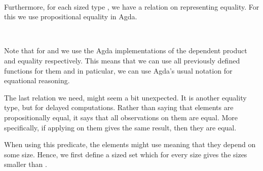 \begin{code}%
\>[0]\AgdaSpace{}%
\AgdaSymbol{:}\AgdaSpace{}%
\AgdaSymbol{(}\AgdaSpace{}%
\AgdaSymbol{:}\AgdaSpace{}%
\AgdaSymbol{)}\AgdaSpace{}%
\AgdaSpace{}%
\AgdaSpace{}%
\AgdaSpace{}%
\AgdaSpace{}%
\<%
\\
\>[0]\AgdaSpace{}%
\AgdaSpace{}%
\AgdaSpace{}%
\AgdaSpace{}%
\AgdaSymbol{=}\AgdaSpace{}%
\AgdaSymbol{(}\AgdaSpace{}%
\AgdaSymbol{:}\AgdaSpace{}%
\AgdaSpace{}%
\AgdaSymbol{)}\AgdaSpace{}%
\AgdaSpace{}%
\AgdaSpace{}%
\<%
\end{code}

Furthermore, for each sized type , we have a relation on  representing equality.
For this we use propositional equality in Agda.

\begin{code}%
\>[0]\AgdaSpace{}%
\AgdaSymbol{:}\AgdaSpace{}%
\AgdaSymbol{(}\AgdaSpace{}%
\AgdaSymbol{:}\AgdaSpace{}%
\AgdaSymbol{)}\AgdaSpace{}%
\AgdaSpace{}%
\AgdaSpace{}%
\AgdaSpace{}%
\<%
\\
\>[0]\AgdaSpace{}%
\AgdaSpace{}%
\AgdaSpace{}%
\AgdaSpace{}%
\AgdaSymbol{=}\AgdaSpace{}%
\AgdaSpace{}%
\AgdaSpace{}%
\<%
\end{code}

Note that for  and  we use the Agda implementations of the dependent product and equality respectively.
This means that we can use all previously defined functions for them and in paticular, we can use Agda's usual notation for equational reasoning.

The last relation we need, might seem a bit unexpected.
It is another equality type, but for delayed computations.
Rather than saying that elements are propositionally equal, it says that all observations on them are equal.
More specifically, if applying  on them gives the same result, then they are equal.

When using this predicate, the elements might use  meaning that they depend on some size.
Hence, we first define a sized set which for every size  gives the sizes smaller than .

